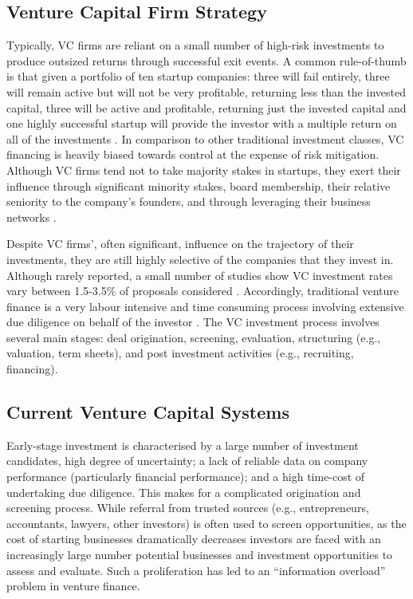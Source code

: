 \documentclass[../thesis/thesis.tex]{subfiles}
\begin{document}
\begin{figure}[!htb]
    \centering
    
    \caption{}
    \label{fig:litreview:criteria:fund}
\end{figure}

\subsection{Venture Capital Firm Strategy}

Typically, VC firms are reliant on a small number of high-risk investments to produce outsized returns through successful exit events. A common rule-of-thumb is that given a portfolio of ten startup companies: three will fail entirely, three will remain active but will not be very profitable, returning less than the invested capital, three will be active and profitable, returning just the invested capital and one highly successful startup will provide the investor with a multiple return on all of the investments \cite{stone2014}. In comparison to other traditional investment classes, VC financing is heavily biased towards control at the expense of risk mitigation. Although VC firms tend not to take majority stakes in startups, they exert their influence through significant minority stakes, board membership, their relative seniority to the company’s founders, and through leveraging their business networks \cite{fried2006}.

Despite VC firms’, often significant, influence on the trajectory of their investments, they are still highly selective of the companies that they invest in. Although rarely reported, a small number of studies show VC investment rates vary between 1.5-3.5\% of proposals considered \cite{stone2014}. Accordingly, traditional venture finance is a very labour intensive and time consuming process involving extensive due diligence on behalf of the investor \cite{fried1994}. The VC investment process involves several main stages: deal origination, screening, evaluation, structuring (e.g., valuation, term sheets), and post investment activities (e.g., recruiting, financing).

\subsection{Current Venture Capital Systems}

Early-stage investment is characterised by a large number of investment candidates, high degree of uncertainty; a lack of reliable data on company performance (particularly financial performance); and a high time-cost of undertaking due diligence. This makes for a complicated origination and screening process. While referral from trusted sources (e.g., entrepreneurs, accountants, lawyers, other investors) is often used to screen opportunities, as the cost of starting businesses dramatically decreases investors are faced with an increasingly large number potential businesses and investment opportunities to assess and evaluate. Such a proliferation has led to an “information overload” problem in venture finance.
\end{document}
